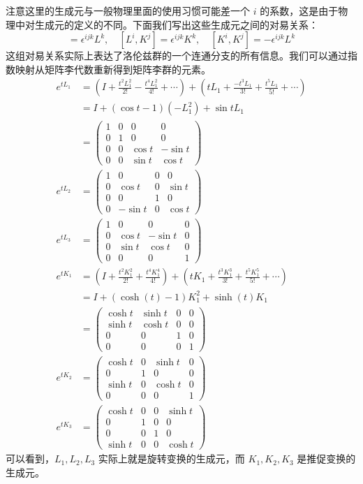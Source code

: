 注意这里的生成元与一般物理里面的使用习惯可能差一个 $i$ 的系数，这是由于物理中对生成元的定义的不同。下面我们写出这些生成元之间的对易关系：
\begin{equation}
[L^i,L^j]=\epsilon^{ijk}L^k,\quad
[L^i,K^j]=\epsilon^{ijk}K^k,\quad
[K^i,K^j]=-\epsilon^{ijk}L^k
\end{equation}
这组对易关系实际上表达了洛伦兹群的一个连通分支的所有信息。我们可以通过指数映射从矩阵李代数重新得到矩阵李群的元素。
\begin{equation}
\begin{aligned}
e^{tL_1}&=(I+\frac{t^2L_1^2}{2!}-\frac{t^4L_1^2}{4!}+\cdots)+(tL_1+\frac{-t^3L_1}{3!}+\frac{t^5L_1}{5!}+\cdots)\\
&=I+(\cos t-1)(-L_1^2)+\sin t L_1\\
&=
\begin{pmatrix}
1 & 0 & 0 & 0\\
0 & 1 & 0 & 0\\
0 & 0 & \cos t & -\sin t\\
0 & 0 & \sin t & \cos t
\end{pmatrix}\\
e^{tL_2}&=
\begin{pmatrix}
1 & 0 & 0 & 0\\
0 & \cos t & 0 & \sin t\\
0 & 0 & 1 & 0\\
0 & -\sin t & 0 & \cos t
\end{pmatrix}\\
e^{tL_3}&=
\begin{pmatrix}
1 & 0 & 0 & 0\\
0 & \cos t & -\sin t & 0\\
0 & \sin t & \cos t & 0\\
0 & 0 & 0 & 1
\end{pmatrix}
\\
e^{tK_1}&=(I+\frac{t^2K_1^2}{2!}+\frac{t^4K_1^4}{4!})+(tK_1+\frac{t^3K_1^3}{3!}+\frac{t^5K_1^5}{5!}+\cdots)\\
&=I+(\cosh(t)-1)K_1^2+\sinh(t) K_1\\
&=\begin{pmatrix}
\cosh t & \sinh t & 0 & 0\\
\sinh t & \cosh t & 0 & 0\\
0 & 0 & 1 & 0\\
0 & 0 & 0 & 1
\end{pmatrix}
\\
e^{t K_2}&=\begin{pmatrix}
\cosh t & 0 & \sinh t & 0\\
0 & 1 & 0 & 0\\
\sinh t & 0 & \cosh t & 0\\
0 & 0 & 0 & 1
\end{pmatrix}
\\
e^{t K_3}&=\begin{pmatrix}
\cosh t & 0 & 0 & \sinh t\\
0 & 1 & 0 & 0\\
0 & 0 & 1 & 0\\
\sinh t & 0 & 0 & \cosh t
\end{pmatrix}
\end{aligned}
\end{equation}
可以看到，$L_1,L_2,L_3$ 实际上就是旋转变换的生成元，而 $K_1,K_2,K_3$ 是推促变换的生成元。